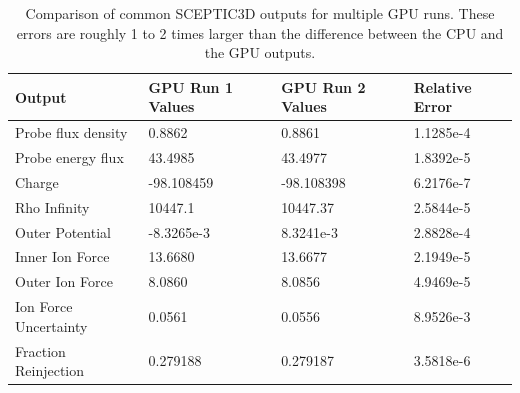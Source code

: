 \begin{table}
\begin{tabular}{| p{4.0cm} | p{3.5cm} | p{2.5cm} | p{4.0cm} |}
\hline
Output 						& GPU Run 1 Values 		& GPU Run 2 Values 		& Relative Error \\ \hline
Probe flux density 		& 0.8862 			& 0.8861 			& 1.1285e-4 \\ \hline
Probe energy flux   		& 43.4985 			& 43.4977 			& 1.8392e-5 \\ \hline
Charge 						& -98.108459 		& -98.108398 		& 6.2176e-7 \\ \hline
Rho Infinity 				& 10447.1 			& 10447.37 			& 2.5844e-5 \\ \hline
Outer Potential 			& -8.3265e-3 		& 8.3241e-3 		& 2.8828e-4 \\ \hline
Inner Ion Force 			& 13.6680 			& 13.6677 			& 2.1949e-5 \\ \hline
Outer Ion Force 			& 8.0860	 			& 8.0856 			& 4.9469e-5 \\ \hline
Ion Force Uncertainty 	& 0.0561 			& 0.0556 			& 8.9526e-3 \\ \hline
Fraction Reinjection 	& 0.279188			& 0.279187 			& 3.5818e-6 \\ \hline
\end{tabular}
\caption[GPU SCEPTIC3D Output Comparison for 2 GPU runs]{Comparison of common SCEPTIC3D outputs for multiple GPU runs. These errors are roughly 1 to 2 times larger than the difference between the CPU and the GPU outputs.}
\label{tab:gpu_gpu_data_compare} 
\end{table}


\clearpage
\newpage





